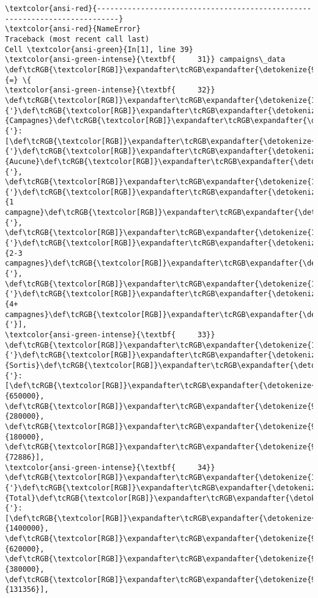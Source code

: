 \documentclass[11pt]{article}
\begin{document}
    \begin{Verbatim}[commandchars=\\\{\}, frame=single, framerule=2mm, rulecolor=\color{outerrorbackground}]
\textcolor{ansi-red}{---------------------------------------------------------------------------}
\textcolor{ansi-red}{NameError}                                 Traceback (most recent call last)
Cell \textcolor{ansi-green}{In[1], line 39}
\textcolor{ansi-green-intense}{\textbf{     31}} campaigns\_data \def\tcRGB{\textcolor[RGB]}\expandafter\tcRGB\expandafter{\detokenize{98,98,98}}{=} \{
\textcolor{ansi-green-intense}{\textbf{     32}}     \def\tcRGB{\textcolor[RGB]}\expandafter\tcRGB\expandafter{\detokenize{175,0,0}}{'}\def\tcRGB{\textcolor[RGB]}\expandafter\tcRGB\expandafter{\detokenize{175,0,0}}{Campagnes}\def\tcRGB{\textcolor[RGB]}\expandafter\tcRGB\expandafter{\detokenize{175,0,0}}{'}: [\def\tcRGB{\textcolor[RGB]}\expandafter\tcRGB\expandafter{\detokenize{175,0,0}}{'}\def\tcRGB{\textcolor[RGB]}\expandafter\tcRGB\expandafter{\detokenize{175,0,0}}{Aucune}\def\tcRGB{\textcolor[RGB]}\expandafter\tcRGB\expandafter{\detokenize{175,0,0}}{'}, \def\tcRGB{\textcolor[RGB]}\expandafter\tcRGB\expandafter{\detokenize{175,0,0}}{'}\def\tcRGB{\textcolor[RGB]}\expandafter\tcRGB\expandafter{\detokenize{175,0,0}}{1 campagne}\def\tcRGB{\textcolor[RGB]}\expandafter\tcRGB\expandafter{\detokenize{175,0,0}}{'}, \def\tcRGB{\textcolor[RGB]}\expandafter\tcRGB\expandafter{\detokenize{175,0,0}}{'}\def\tcRGB{\textcolor[RGB]}\expandafter\tcRGB\expandafter{\detokenize{175,0,0}}{2-3 campagnes}\def\tcRGB{\textcolor[RGB]}\expandafter\tcRGB\expandafter{\detokenize{175,0,0}}{'}, \def\tcRGB{\textcolor[RGB]}\expandafter\tcRGB\expandafter{\detokenize{175,0,0}}{'}\def\tcRGB{\textcolor[RGB]}\expandafter\tcRGB\expandafter{\detokenize{175,0,0}}{4+ campagnes}\def\tcRGB{\textcolor[RGB]}\expandafter\tcRGB\expandafter{\detokenize{175,0,0}}{'}],
\textcolor{ansi-green-intense}{\textbf{     33}}     \def\tcRGB{\textcolor[RGB]}\expandafter\tcRGB\expandafter{\detokenize{175,0,0}}{'}\def\tcRGB{\textcolor[RGB]}\expandafter\tcRGB\expandafter{\detokenize{175,0,0}}{Sortis}\def\tcRGB{\textcolor[RGB]}\expandafter\tcRGB\expandafter{\detokenize{175,0,0}}{'}: [\def\tcRGB{\textcolor[RGB]}\expandafter\tcRGB\expandafter{\detokenize{98,98,98}}{650000}, \def\tcRGB{\textcolor[RGB]}\expandafter\tcRGB\expandafter{\detokenize{98,98,98}}{280000}, \def\tcRGB{\textcolor[RGB]}\expandafter\tcRGB\expandafter{\detokenize{98,98,98}}{180000}, \def\tcRGB{\textcolor[RGB]}\expandafter\tcRGB\expandafter{\detokenize{98,98,98}}{72886}],
\textcolor{ansi-green-intense}{\textbf{     34}}     \def\tcRGB{\textcolor[RGB]}\expandafter\tcRGB\expandafter{\detokenize{175,0,0}}{'}\def\tcRGB{\textcolor[RGB]}\expandafter\tcRGB\expandafter{\detokenize{175,0,0}}{Total}\def\tcRGB{\textcolor[RGB]}\expandafter\tcRGB\expandafter{\detokenize{175,0,0}}{'}: [\def\tcRGB{\textcolor[RGB]}\expandafter\tcRGB\expandafter{\detokenize{98,98,98}}{1400000}, \def\tcRGB{\textcolor[RGB]}\expandafter\tcRGB\expandafter{\detokenize{98,98,98}}{620000}, \def\tcRGB{\textcolor[RGB]}\expandafter\tcRGB\expandafter{\detokenize{98,98,98}}{380000}, \def\tcRGB{\textcolor[RGB]}\expandafter\tcRGB\expandafter{\detokenize{98,98,98}}{131356}],

\end{Verbatim}
\end{document}
